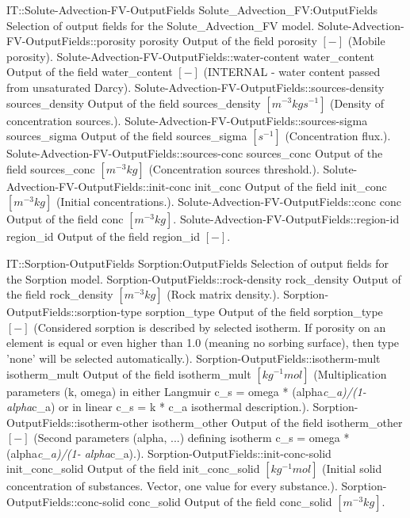 \begin{SelectionType}
	{IT::Solute-Advection-FV-OutputFields}
	{Solute{\_}Advection{\_}FV:OutputFields}
	{{{Selection of output fields for the Solute{\_}Advection{\_}FV model.}}}
		\SelectionItem
			{Solute-Advection-FV-OutputFields::porosity}
			{porosity}
			{{{Output of the field porosity }{$[-]$}{ (Mobile porosity).}}}
		\SelectionItem
			{Solute-Advection-FV-OutputFields::water-content}
			{water{\_}content}
			{{{Output of the field water{\_}content }{$[-]$}{ (INTERNAL - water content passed from unsaturated Darcy).}}}
		\SelectionItem
			{Solute-Advection-FV-OutputFields::sources-density}
			{sources{\_}density}
			{{{Output of the field sources{\_}density }{$[m^{-3}kgs^{-1}]$}{ (Density of concentration sources.).}}}
		\SelectionItem
			{Solute-Advection-FV-OutputFields::sources-sigma}
			{sources{\_}sigma}
			{{{Output of the field sources{\_}sigma }{$[s^{-1}]$}{ (Concentration flux.).}}}
		\SelectionItem
			{Solute-Advection-FV-OutputFields::sources-conc}
			{sources{\_}conc}
			{{{Output of the field sources{\_}conc }{$[m^{-3}kg]$}{ (Concentration sources threshold.).}}}
		\SelectionItem
			{Solute-Advection-FV-OutputFields::init-conc}
			{init{\_}conc}
			{{{Output of the field init{\_}conc }{$[m^{-3}kg]$}{ (Initial concentrations.).}}}
		\SelectionItem
			{Solute-Advection-FV-OutputFields::conc}
			{conc}
			{{{Output of the field conc }{$[m^{-3}kg]$}{.}}}
		\SelectionItem
			{Solute-Advection-FV-OutputFields::region-id}
			{region{\_}id}
			{{{Output of the field region{\_}id }{$[-]$}{.}}}
\end{SelectionType}
\begin{SelectionType}
	{IT::Sorption-OutputFields}
	{Sorption:OutputFields}
	{{{Selection of output fields for the Sorption model.}}}
		\SelectionItem
			{Sorption-OutputFields::rock-density}
			{rock{\_}density}
			{{{Output of the field rock{\_}density }{$[m^{-3}kg]$}{ (Rock matrix density.).}}}
		\SelectionItem
			{Sorption-OutputFields::sorption-type}
			{sorption{\_}type}
			{{{Output of the field sorption{\_}type }{$[-]$}{ (Considered sorption is described by selected isotherm. If porosity on an element is equal or even higher than 1.0 (meaning no sorbing surface), then type 'none' will be selected automatically.).}}}
		\SelectionItem
			{Sorption-OutputFields::isotherm-mult}
			{isotherm{\_}mult}
			{{{Output of the field isotherm{\_}mult }{$[kg^{-1}mol]$}{ (Multiplication parameters (k, omega) in either Langmuir c{\_}s = omega * (alpha}\textit{c{\_}a)/(1- alpha}{c{\_}a) or in linear c{\_}s = k * c{\_}a isothermal description.).}}}
		\SelectionItem
			{Sorption-OutputFields::isotherm-other}
			{isotherm{\_}other}
			{{{Output of the field isotherm{\_}other }{$[-]$}{ (Second parameters (alpha, ...) defining isotherm  c{\_}s = omega * (alpha}\textit{c{\_}a)/(1- alpha}{c{\_}a).).}}}
		\SelectionItem
			{Sorption-OutputFields::init-conc-solid}
			{init{\_}conc{\_}solid}
			{{{Output of the field init{\_}conc{\_}solid }{$[kg^{-1}mol]$}{ (Initial solid concentration of substances. Vector, one value for every substance.).}}}
		\SelectionItem
			{Sorption-OutputFields::conc-solid}
			{conc{\_}solid}
			{{{Output of the field conc{\_}solid }{$[m^{-3}kg]$}{.}}}
\end{SelectionType}
